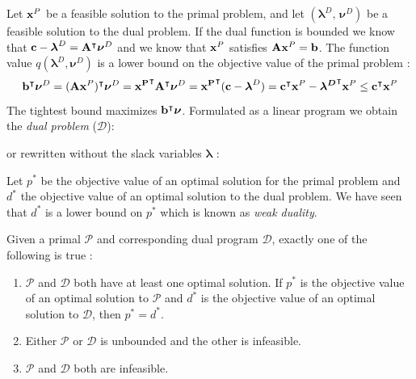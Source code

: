 Let $\bold x^P$ be a feasible solution to the primal problem, and let $(\boldsymbol \lambda^D, \, \boldsymbol \nu^D)$ be a feasible solution to the dual problem. If the dual function is bounded we know that $\bold c - \boldsymbol \lambda^D = \bold A^\intercal \boldsymbol \nu^D$ and we know that $\bold x^P$ satisfies $ \bold A\bold x^P = \bold b$. The function value $q(\boldsymbol \lambda^D, \boldsymbol \nu^D)$ is a lower bound on the objective value of the primal problem \cite{aps_mosek_nodate}: 
\begin{equation*}
    \bold b^\intercal \boldsymbol \nu^D
    = (\bold A \bold x^P)^\intercal \boldsymbol \nu^D 
    = \bold {x^P}^\intercal \bold A^\intercal \boldsymbol \nu^D 
    = \bold {x^P}^\intercal (\bold c - \boldsymbol \lambda^D) 
    = \bold c^\intercal \bold x^P  - \boldsymbol {\lambda^D}^\intercal \bold x^P
    \leq \bold c^\intercal \bold x^P
\end{equation*}
The tightest bound maximizes $\bold b^\intercal \boldsymbol \nu$. Formulated as a linear program we obtain the \textit{dual problem} ($\mathcal{D}$):
or rewritten without the slack variables $\boldsymbol \lambda$ \cite{noauthor_numerical_2006}:
Let $p^*$ be the objective value of an optimal solution for the primal problem and $d^*$ the objective value of an optimal solution to the dual problem. We have seen that $d^*$ is a lower bound on $p^*$ which is known as \textit{weak duality}. 
\begin{theorem} \label{theorem:strong_duality}
    Given a primal $\mathcal{P}$ and corresponding dual program $\mathcal{D}$, exactly one of the following is true \cite{noauthor_numerical_2006}:
    \begin{enumerate}
        \item $\mathcal{P}$ and $\mathcal{D}$ both have at least one optimal solution. If $p^*$ is the objective value of an optimal solution to $\mathcal{P}$ and $d^*$ is the objective value of an optimal solution to $\mathcal{D}$, then $p^*=d^*$.
        \item Either $\mathcal{P}$ or $\mathcal{D}$ is unbounded and the other is infeasible. 
        \item $\mathcal{P}$ and $\mathcal{D}$ both are infeasible.
    \end{enumerate}
\end{theorem}
